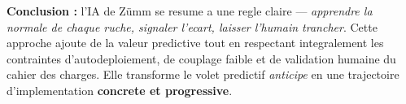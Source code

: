 \begin{encadre}
\textbf{Conclusion :} l'IA de Z\"umm se resume a une regle claire --- \emph{apprendre
la normale de chaque ruche, signaler l'ecart, laisser l'humain trancher}. Cette
approche ajoute de la valeur predictive tout en respectant integralement les
contraintes d'autodeploiement, de couplage faible et de validation humaine du
cahier des charges. Elle transforme le volet predictif \emph{anticipe} en une
trajectoire d'implementation \textbf{concrete et progressive}.
\end{encadre}

